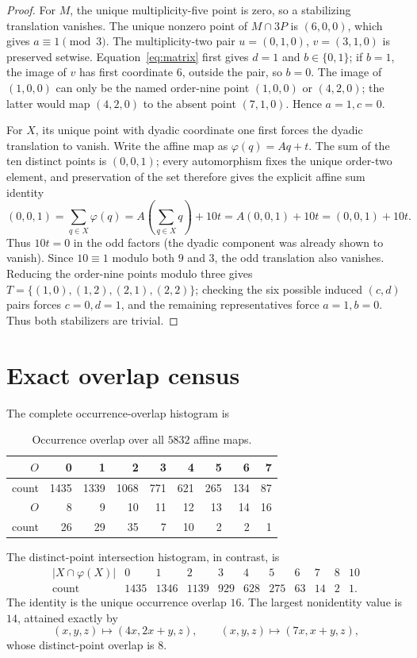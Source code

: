 \documentclass[10pt]{article}
\begin{document}
\begin{proof}
For $M$, the unique multiplicity-five point is zero, so a stabilizing
translation vanishes.  The unique nonzero point of $M\cap3P$ is $(6,0,0)$,
which gives $a\equiv1\pmod3$.  The multiplicity-two pair
$u=(0,1,0)$, $v=(3,1,0)$ is preserved setwise.  Equation~\eqref{eq:matrix}
first gives $d=1$ and $b\in\{0,1\}$; if $b=1$, the image of $v$ has first
coordinate $6$, outside the pair, so $b=0$.  The image of $(1,0,0)$ can only be the named
order-nine point $(1,0,0)$ or $(4,2,0)$; the latter would map $(4,2,0)$ to
the absent point $(7,1,0)$.  Hence $a=1,c=0$.

For $X$, its unique point with dyadic coordinate one first forces the dyadic
translation to vanish.  Write the affine map as
$\varphi(q)=Aq+t$.  The sum of the ten distinct points is $(0,0,1)$;
every automorphism fixes the unique order-two element, and preservation of
the set therefore gives the explicit affine sum identity
\[
 (0,0,1)=\sum_{q\in X}\varphi(q)
 =A\!\left(\sum_{q\in X}q\right)+10t
 =A(0,0,1)+10t=(0,0,1)+10t.
\]
Thus $10t=0$ in the odd factors (the dyadic component was already shown to
vanish).  Since $10\equiv1$ modulo both $9$ and $3$, the odd translation also
vanishes.
Reducing the order-nine points modulo three gives
$T=\{(1,0),(1,2),(2,1),(2,2)\}$; checking the six possible induced
$(c,d)$ pairs forces $c=0,d=1$, and the remaining representatives force
$a=1,b=0$.  Thus both stabilizers are trivial.
\end{proof}

\section{Exact overlap census}
The complete occurrence-overlap histogram is
\begin{table}[htbp]
\centering\small
\setlength{\tabcolsep}{3.7pt}
\begin{tabular}{r|rrrrrrrr}
\toprule
$O$&0&1&2&3&4&5&6&7\\
\midrule
count&1435&1339&1068&771&621&265&134&87\\
\midrule
$O$&8&9&10&11&12&13&14&16\\
\midrule
count&26&29&35&7&10&2&2&1\\
\bottomrule
\end{tabular}
\caption{Occurrence overlap over all $5832$ affine maps.}
\label{tab:multiset}
\end{table}

The distinct-point intersection histogram, in contrast, is
\[
\begin{array}{c|rrrrrrrrrr}
|X\cap\varphi(X)|&0&1&2&3&4&5&6&7&8&10\\\hline
\text{count}&1435&1346&1139&929&628&275&63&14&2&1.
\end{array}
\]
The identity is the unique occurrence overlap $16$.  The largest nonidentity
value is $14$, attained exactly by
\[
 (x,y,z)\mapsto(4x,2x+y,z),
 \qquad (x,y,z)\mapsto(7x,x+y,z),
\]
whose distinct-point overlap is $8$.
\end{document}
